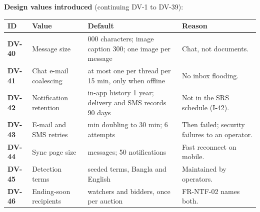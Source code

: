 \documentclass[11pt,a4paper]{article}
\newenvironment{dtable}[1]{\small\begin{longtable}{#1}}{\end{longtable}}
\begin{document}
\textbf{Design values introduced} (continuing DV-1 to DV-39):
\begin{dtable}{@{}>{\bfseries}p{1.3cm}>{\raggedright\arraybackslash}p{4.6cm}>{\raggedright\arraybackslash}p{4.6cm}>{\raggedright\arraybackslash}p{4.4cm}@{}}
\toprule
\textnormal{\textbf{ID}} & \textbf{Value} & \textbf{Default} & \textbf{Reason} \\ \midrule \endhead
DV-40 & Message size & 2{,}000 characters; image caption 300; one image per message & Chat, not documents. \\
DV-41 & Chat e-mail coalescing & at most one per thread per 15 min, only when offline & No inbox flooding. \\
DV-42 & Notification retention & in-app history 1 year; delivery and SMS records 90 days & Not in the SRS schedule (I-42). \\
DV-43 & E-mail and SMS retries & 1 min doubling to 30 min; 6 attempts & Then failed; security failures to an operator. \\
DV-44 & Sync page size & 200 messages; 50 notifications & Fast reconnect on mobile. \\
DV-45 & Detection terms & 31 seeded terms, Bangla and English & Maintained by operators. \\
DV-46 & Ending-soon recipients & watchers and bidders, once per auction & FR-NTF-02 names both. \\
\bottomrule
\end{dtable}
\end{document}
